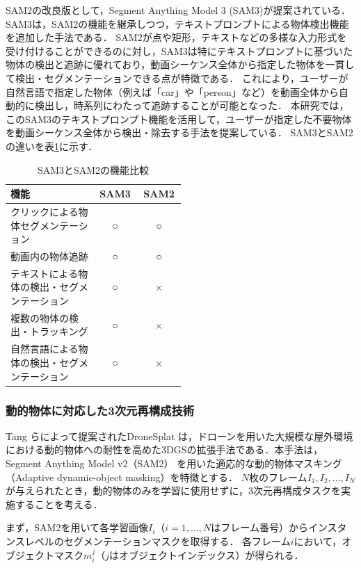 \documentclass[a4paper,dvipdfmx,ja=standard,9pt]{bxjsarticle}
\begin{document}
SAM2の改良版として，Segment Anything Model 3 (SAM3)\cite{carion2025sam3segmentconcepts}が提案されている．
SAM3は，SAM2の機能を継承しつつ，テキストプロンプトによる物体検出機能を追加した手法である．
SAM2が点や矩形，テキストなどの多様な入力形式を受け付けることができるのに対し，SAM3は特にテキストプロンプトに基づいた物体の検出と追跡に優れており，動画シーケンス全体から指定した物体を一貫して検出・セグメンテーションできる点が特徴である．
これにより，ユーザーが自然言語で指定した物体（例えば「car」や「person」など）を動画全体から自動的に検出し，時系列にわたって追跡することが可能となった．
本研究では，このSAM3のテキストプロンプト機能を活用して，ユーザーが指定した不要物体を動画シーケンス全体から検出・除去する手法を提案している．
SAM3とSAM2の違いを表\ref{tab:sam3_sam2}に示す．
\begin{table}[htbp]
  \centering
  \caption{SAM3とSAM2の機能比較}
  \label{tab:sam3_sam2}
  \begin{tabular}{p{0.5\linewidth}|c|c}
    \toprule
    \textbf{機能} & \textbf{SAM3} & \textbf{SAM2} \\
    \midrule
    クリックによる物体セグメンテーション & ○ & ○ \\
    \midrule
    動画内の物体追跡 & ○ & ○ \\
    \midrule
    テキストによる物体の検出・セグメンテーション & ○ & × \\
    \midrule
    複数の物体の検出・トラッキング & ○ & × \\
    \midrule
    自然言語による物体の検出・セグメンテーション & ○ & × \\
    \bottomrule
  \end{tabular}
\end{table}\vspace{20pt}

\subsubsection{動的物体に対応した3次元再構成技術}
Tang らによって提案されたDroneSplat\cite{tang2025dronesplat3dgaussiansplatting} は，ドローンを用いた大規模な屋外環境における動的物体への耐性を高めた3DGS\cite{kerbl3Dgaussians}の拡張手法である．本手法は，Segment Anything Model v2（SAM2）\cite{ravi2024sam2} を用いた適応的な動的物体マスキング（Adaptive dynamic-object masking）を特徴とする．
$N$枚のフレーム$I_1, I_2, ..., I_N$が与えられたとき，動的物体のみを学習に使用せずに，3次元再構成タスクを実施することを考える．

まず，SAM2を用いて各学習画像$I_i$（$i = 1, \ldots, N$はフレーム番号）からインスタンスレベルのセグメンテーションマスクを取得する．
各フレーム$i$において，オブジェクトマスク$m_i^j$（$j$はオブジェクトインデックス）が得られる．
\end{document}
